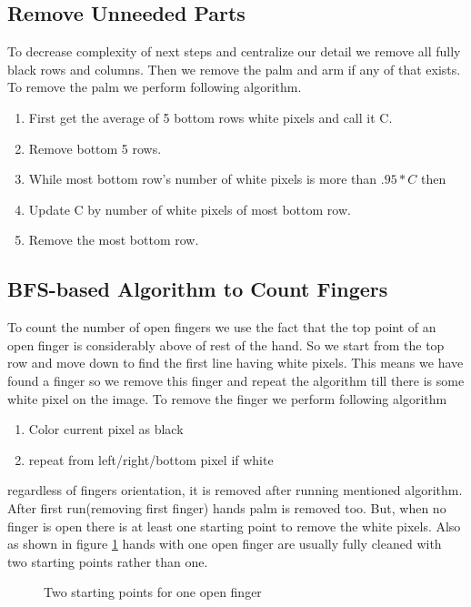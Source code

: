 \documentclass{report}
\begin{document}
\subsection{Remove Unneeded Parts}
To decrease complexity of next steps and centralize our detail we remove all fully black rows and columns. Then we remove the palm and arm if any of that exists. To remove the palm we perform following algorithm.
\begin{enumerate}
\item{First get the average of 5 bottom rows white pixels and call it C.}
\item{Remove bottom 5 rows.}
\item{While most bottom row's number of white pixels is more than $.95 * C$ then }
\item{Update C by number of white pixels of most bottom row.}
\item{Remove the most bottom row.}
\end{enumerate} 

\subsection{BFS-based Algorithm to Count Fingers}
To count the number of open fingers we use the fact that the top point of an open finger is considerably above of rest of the hand. So we start from the top row and move down to find the first line having white pixels. This means we have found a finger so we remove this finger and repeat the algorithm till there is some white pixel on the image. To remove the finger we perform following algorithm 
\begin{enumerate}
	\item{Color current pixel as black}
	\item{repeat from left/right/bottom pixel if white}
\end{enumerate}
regardless of fingers orientation, it is removed after running mentioned algorithm. After first run(removing first finger) hands palm is removed too. But, when no finger is open there is at least one starting point to remove the white pixels. Also as shown in figure \ref{fig:twostarts} hands with one open finger are usually fully cleaned with two starting points rather than one. 
\begin{center}
\begin{figure}
\caption{Two starting points for one open finger}
\label{fig:twostarts}
\end{figure}
\end{center}
\end{document}
